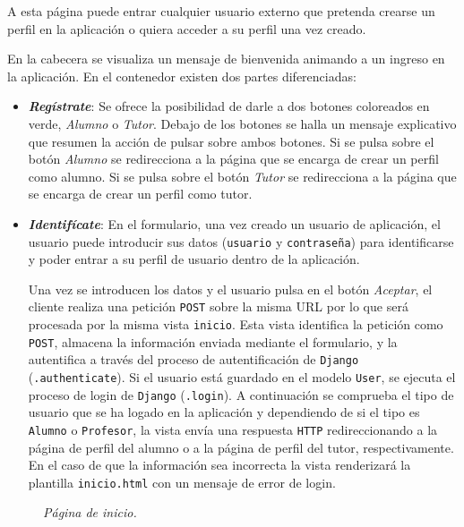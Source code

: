 \documentclass[a4paper, 12pt]{book}
\begin{document}
A esta p\'agina puede entrar cualquier usuario externo que pretenda crearse un perfil en la aplicaci\'on o quiera acceder a su perfil una vez creado.

En la cabecera se visualiza un mensaje de bienvenida animando a un ingreso en la aplicaci\'on. En el contenedor existen dos partes diferenciadas: 
\begin{itemize}
  \item {\bfseries \textit{Reg\'istrate}}: Se ofrece la posibilidad de darle a dos botones coloreados en verde, \textit{Alumno} o \textit{Tutor}. Debajo 
  de los botones se halla un mensaje explicativo que resumen la acci\'on de pulsar sobre ambos botones. Si se pulsa sobre el bot\'on \textit{Alumno} se 
  redirecciona a la p\'agina que se encarga de crear un perfil como alumno. Si se pulsa sobre el bot\'on \textit{Tutor} se redirecciona a la p\'agina que 
  se encarga de crear un perfil como tutor.
  \item {\bfseries \textit{Identif\'icate}}: En el formulario, una vez creado un usuario de aplicaci\'on, el usuario puede introducir sus datos 
  (\texttt{usuario} y \texttt{contrase\~na}) para identificarse y poder entrar a su perfil de usuario dentro de la aplicaci\'on. 
  
  Una vez se introducen los datos y el usuario pulsa en el bot\'on \textit{Aceptar}, el cliente realiza una petici\'on \texttt{POST} sobre la misma URL 
  por lo que ser\'a procesada por la misma vista \texttt{inicio}. Esta vista identifica la petici\'on como \texttt{POST}, almacena la informaci\'on enviada
  mediante el formulario, y la autentifica a trav\'es del proceso de autentificaci\'on de \texttt{Django} (\texttt{.authenticate}). Si el usuario est\'a 
  guardado en el modelo \texttt{User}, se ejecuta el proceso de login de \texttt{Django} (\texttt{.login}). A continuaci\'on se comprueba el tipo de usuario
  que se ha logado en la aplicaci\'on y dependiendo de si el tipo es \texttt{Alumno} o \texttt{Profesor}, la vista env\'ia una respuesta \texttt{HTTP} 
  redireccionando a la p\'agina de perfil del alumno o a la p\'agina de perfil del tutor, respectivamente. En el caso de que la informaci\'on sea incorrecta 
  la vista renderizar\'a la plantilla \texttt{inicio.html} con un mensaje de error de login.
\end{itemize}

\begin{figure}
  \centering
  \caption{\textit{P\'agina de inicio.}}
  \label{fig:paginainicio}
\end{figure}
\end{document}
